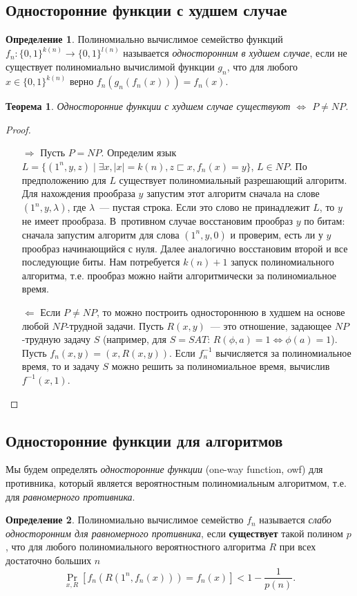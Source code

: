 \documentclass[12pt,a4paper]{article}
\newcommand{\bits}{\{0,1\}}
\theoremstyle{definition}
\newtheorem{definition}{Определение}[section]
\theoremstyle{plain}
\newtheorem{theorem}{Теорема}[section]
\theoremstyle{remark}
\begin{document}
\subsection{Односторонние функции с худшем случае}
\begin{definition}
Полиномиально вычислимое семейство функций $f_n:\bits^{k(n)}\to \bits^{l(n)}$ называется 
\emph{односторонним в худшем случае}, если не существует полиномиально вычислимой функции 
$g_n$, что для любого $x\in\bits^{k(n)}$ верно $f_n(g_n(f_n(x))) = f_n(x)$.
\end{definition}

\begin{theorem}\label{th:weak-owf-p-np}
Односторонние функции с худшем случае существуют $\iff$ $P\neq NP$.
\end{theorem}
\begin{proof}\mbox{}
\begin{itemize}
\item[$\Rightarrow$] Пусть $P=NP$.
Определим язык $L = \{(1^n, y, z) \mid \exists x, |x| = k(n), z \sqsubset x, f_n(x) = y\}$, $L\in NP$. По предположению для $L$ существует полиномиальный разрешающий алгоритм. 
Для нахождения прообраза $y$ запустим этот алгоритм сначала на 
слове $(1^n, y, \lambda)$, где $\lambda$~--- пустая строка. 
Если это слово не принадлежит $L$, то $y$ не имеет прообраза.
В~противном случае восстановим прообраз $y$ по битам: сначала запустим алгоритм для слова $(1^n, y, 0)$ и проверим, есть ли у $y$ прообраз начинающийся с нуля. Далее аналогично восстановим второй и все последующие биты. Нам потребуется $k(n) + 1$ запуск полиномиального алгоритма, т.е. прообраз можно найти алгоритмически за полиномиальное время.

\item[$\Leftarrow$] Если $P\neq NP$, то можно построить одностороннюю в худшем на основе любой $NP$-трудной задачи.
Пусть $R(x,y)$~--- это отношение, задающее $NP$-трудную задачу $S$
(например, для $S = SAT$: $R(\phi, a) = 1 \iff \phi(a) = 1$). Пусть $f_n(x, y) = (x, R(x,y))$. 
Если $f_n^{-1}$ вычисляется за полиномиальное время, то и задачу $S$ можно решить за полиномиальное время,
вычислив $f^{-1}(x, 1)$.
\end{itemize}
\end{proof}


\subsection{Односторонние функции для алгоритмов}
Мы будем определять \emph{односторонние функции} (one-way function, owf) для противника, который является 
вероятностным полиномиальным алгоритмом, т.е. для \emph{равномерного противника}.
\begin{definition}
    Полиномиально вычислимое семейство $f_n$ называется
    \emph{слабо односторонним для равномерного противника}, 
    если \textbf{существует} такой полином $p$, что 
    для любого полиномиального вероятностного алгоритма $R$ 
    при всех достаточно больших $n$
    $$\Pr_{x,R}[f_n(R(1^n, f_n(x))) = f_n(x)] < 1 - \frac{1}{p(n)}.$$

\end{definition}
\end{document}
